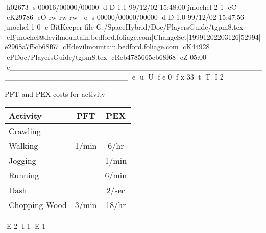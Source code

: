 h02673
s 00016/00000/00000
d D 1.1 99/12/02 15:48:00 jmochel 2 1
cC
cK29786
cO-rw-rw-rw-
e
s 00000/00000/00000
d D 1.0 99/12/02 15:47:56 jmochel 1 0
c BitKeeper file G:/SpaceHybrid/Doc/PlayersGuide/tgpm8.tex
cBjmochel@devilmountain.bedford.foliage.com|ChangeSet|19991202203126|52994|e2968a7f5cb68f67
cHdevilmountain.bedford.foliage.com
cK44928
cPDoc/PlayersGuide/tgpm8.tex
cReb4785665cb68f68
cZ-05:00
c______________________________________________________________________
e
u
U
f e 0
f x 33
t
T
I 2
\begin{SHTable}{PFT and PEX costs for activity}
	\begin{tabular}{lcc}

	Activity		&	PFT & PEX \\	
\hline
	Crawling		&	   &	  \\
	Walking			& 1/min	& 6/hr \\
	Jogging			&		& 1/min \\
	Running			&	   & 6/min \\
	Dash			&		& 2/sec \\
	Chopping Wood	 & 3/min & 18/hr \\
    \end{tabular}
    \caption{PFT and PEX costs for activity}
\end{SHTable}
E 2
I 1
E 1
